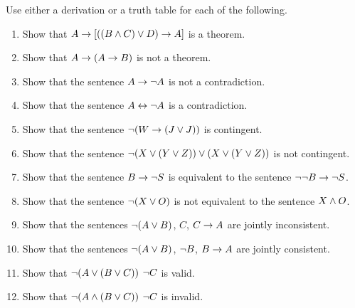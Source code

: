 \practiceproblems
\noindent\problempart Use either a derivation or a truth table for each of the following.
\begin{enumerate}%
\item Show that $A \rightarrow [((B \wedge C) \vee D) \rightarrow A]$ is a theorem.
\item Show that $A \rightarrow (A \rightarrow B)$ is not a theorem.
\item Show that the sentence $A \rightarrow \neg{A}$ is not a contradiction.
\item Show that the sentence $A \leftrightarrow \neg A$ is a contradiction.
\item Show that the sentence $ \neg (W \rightarrow (J \vee J)) $ is contingent.
\item Show that the sentence $ \neg(X \vee (Y \vee Z)) \vee (X \vee (Y \vee Z))$ is not contingent.
 \item Show that the sentence $B \rightarrow \neg S$ is equivalent to the sentence $\neg \neg B \rightarrow \neg S$.
\item Show that the sentence $ \neg (X \vee O) $ is not equivalent to the sentence $X \wedge O$.
\item Show that the sentences $\neg(A \vee B)$, $C$, $C \rightarrow A$  are jointly inconsistent.
\item Show that the sentences $\neg(A \vee B)$, $\neg{B}$, $B \rightarrow A$ are jointly consistent.
\item Show that $\neg(A \vee (B \vee C)) $ \therefore $ \neg{C}$ is valid.
\item Show that $\neg(A \wedge (B \vee C))$ \therefore $ \neg{C}$ is invalid.
\end{enumerate}


